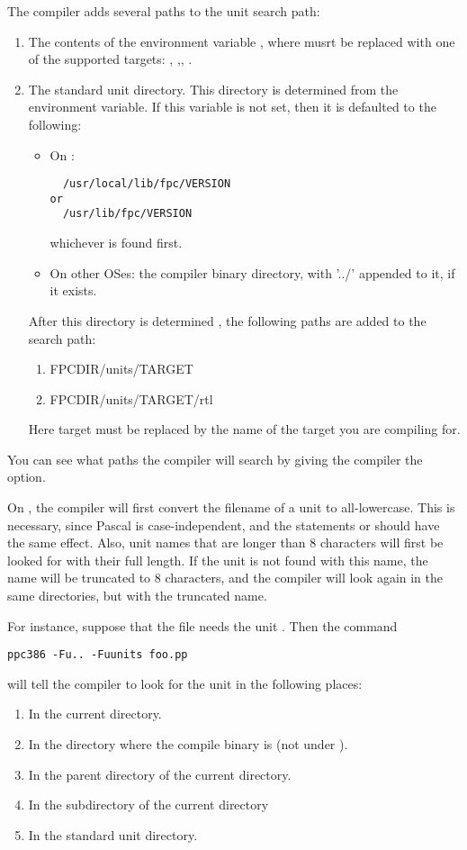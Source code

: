 \documentclass{book}
\begin{document}
The compiler adds several paths to the unit search path:
\begin{enumerate}
\item The contents of the environment variable , where 
musrt be replaced with one of the supported targets: ,
,, .
\item The standard unit directory. This directory is determined
from the  environment variable. If this variable is not set,
then it is defaulted to the following:
\begin{itemize}
\item On \linux:
\begin{verbatim}
  /usr/local/lib/fpc/VERSION
or
  /usr/lib/fpc/VERSION
\end{verbatim}
whichever is found first.
\item On other OSes: the compiler binary directory, with '../' appended
to it, if it exists.
\end{itemize}
After this directory is determined , the following paths are added to the
search path:
\begin{enumerate}
\item FPCDIR/units/TARGET
\item FPCDIR/units/TARGET/rtl
\end{enumerate}
Here target must be replaced by the name of the target you are compiling for.
\end{enumerate}
You can see what paths the compiler will search by giving the compiler
the  option.

On \linux, the compiler will first convert the filename of a unit to
all-lowercase. This is necessary, since Pascal is case-independent, and
the statements  or  should have the same
effect.
Also, unit names that are longer than 8 characters will first be looked for
with their full length. If the unit is not found with this name, the name
will be truncated to 8 characters, and the compiler will look again in the
same directories, but with the truncated name.

For instance, suppose that the file  needs the unit
. Then the command
\begin{verbatim}
ppc386 -Fu.. -Fuunits foo.pp
\end{verbatim}
will tell the compiler to look for the unit  in the following
places:
\begin{enumerate}
\item In the current directory.
\item In the directory where the compile binary is (not under \linux).
\item In the parent directory of the current directory.
\item In the subdirectory  of the current directory
\item In the standard unit directory.
\end{enumerate}
\end{document}
